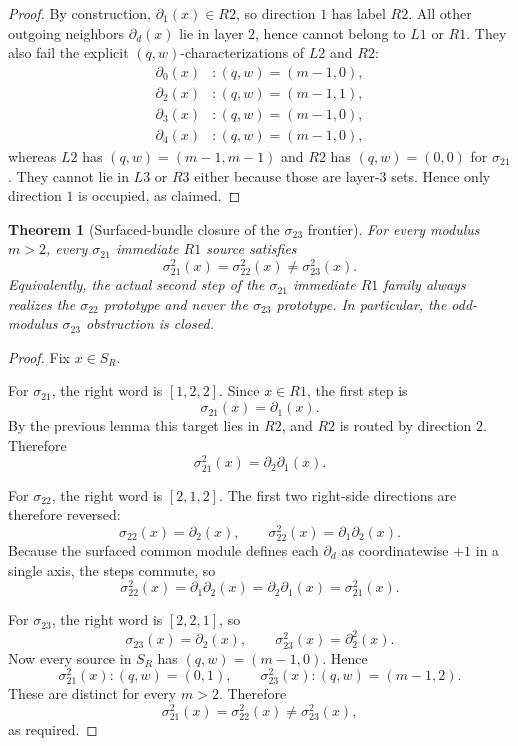 \documentclass[11pt]{article}
\newtheorem{theorem}{Theorem}
\theoremstyle{remark}
\newcommand{\stepd}[1]{\partial_{#1}}
\begin{document}
\begin{proof}
By construction, \(\stepd{1}(x)\in R2\), so direction \(1\) has label \(R2\).
All other outgoing neighbors \(\stepd{d}(x)\) lie in layer \(2\), hence cannot belong to \(L1\) or \(R1\).
They also fail the explicit \((q,w)\)-characterizations of \(L2\) and \(R2\):
\begin{align*}
\stepd{0}(x)&:(q,w)=(m-1,0),\\
\stepd{2}(x)&:(q,w)=(m-1,1),\\
\stepd{3}(x)&:(q,w)=(m-1,0),\\
\stepd{4}(x)&:(q,w)=(m-1,0),
\end{align*}
whereas \(L2\) has \((q,w)=(m-1,m-1)\) and \(R2\) has \((q,w)=(0,0)\) for \(\sigma_{21}\).
They cannot lie in \(L3\) or \(R3\) either because those are layer-3 sets.  Hence only direction \(1\) is occupied,
as claimed.
\end{proof}

\begin{theorem}[Surfaced-bundle closure of the \(\sigma_{23}\) frontier]
For every modulus \(m>2\), every \(\sigma_{21}\) immediate \(R1\) source satisfies
\[
\sigma_{21}^2(x)=\sigma_{22}^2(x)\neq \sigma_{23}^2(x).
\]
Equivalently, the actual second step of the \(\sigma_{21}\) immediate \(R1\) family always realizes the
\(\sigma_{22}\) prototype and never the \(\sigma_{23}\) prototype.  In particular, the odd-modulus
\(\sigma_{23}\) obstruction is closed.
\end{theorem}

\begin{proof}
Fix \(x\in S_R\).

For \(\sigma_{21}\), the right word is \([1,2,2]\).  Since \(x\in R1\), the first step is
\[
\sigma_{21}(x)=\stepd{1}(x).
\]
By the previous lemma this target lies in \(R2\), and \(R2\) is routed by direction \(2\).  Therefore
\[
\sigma_{21}^2(x)=\stepd{2}\stepd{1}(x).
\]

For \(\sigma_{22}\), the right word is \([2,1,2]\).  The first two right-side directions are therefore reversed:
\[
\sigma_{22}(x)=\stepd{2}(x),\qquad \sigma_{22}^2(x)=\stepd{1}\stepd{2}(x).
\]
Because the surfaced common module defines each \(\stepd{d}\) as coordinatewise \(+1\) in a single axis, the
steps commute, so
\[
\sigma_{22}^2(x)=\stepd{1}\stepd{2}(x)=\stepd{2}\stepd{1}(x)=\sigma_{21}^2(x).
\]

For \(\sigma_{23}\), the right word is \([2,2,1]\), so
\[
\sigma_{23}(x)=\stepd{2}(x),\qquad \sigma_{23}^2(x)=\stepd{2}^2(x).
\]
Now every source in \(S_R\) has \((q,w)=(m-1,0)\).  Hence
\[
\sigma_{21}^2(x): (q,w)=(0,1),
\qquad
\sigma_{23}^2(x): (q,w)=(m-1,2).
\]
These are distinct for every \(m>2\).  Therefore
\[
\sigma_{21}^2(x)=\sigma_{22}^2(x)\neq \sigma_{23}^2(x),
\]
as required.
\end{proof}
\end{document}

